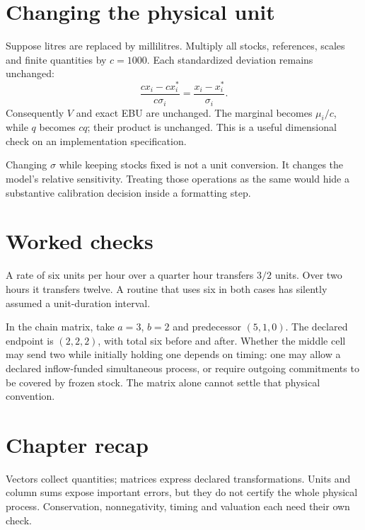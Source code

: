 \section{Changing the physical unit}
Suppose litres are replaced by millilitres. Multiply all stocks, references,
scales and finite quantities by $c=1000$. Each standardized deviation remains
unchanged:
\begin{equation}
 \frac{c x_i-c x_i^*}{c\sigma_i}
 =\frac{x_i-x_i^*}{\sigma_i}.
\end{equation}
Consequently $V$ and exact EBU are unchanged. The marginal becomes
$\mu_i/c$, while $q$ becomes $cq$; their product is unchanged. This is a
useful dimensional check on an implementation specification.

Changing $\sigma$ while keeping stocks fixed is not a unit conversion. It
changes the model's relative sensitivity. Treating those operations as the
same would hide a substantive calibration decision inside a formatting step.

\section*{Worked checks}
A rate of six units per hour over a quarter hour transfers $3/2$ units.
Over two hours it transfers twelve. A routine that uses six in both cases
has silently assumed a unit-duration interval.

In the chain matrix, take $a=3$, $b=2$ and predecessor $(5,1,0)$.
The declared endpoint is $(2,2,2)$, with total six before and after. Whether
the middle cell may send two while initially holding one depends on timing:
one may allow a declared inflow-funded simultaneous process, or require
outgoing commitments to be covered by frozen stock. The matrix alone cannot
settle that physical convention.

\section*{Chapter recap}
Vectors collect quantities; matrices express declared transformations. Units
and column sums expose important errors, but they do not certify the whole
physical process. Conservation, nonnegativity, timing and valuation each
need their own check.
